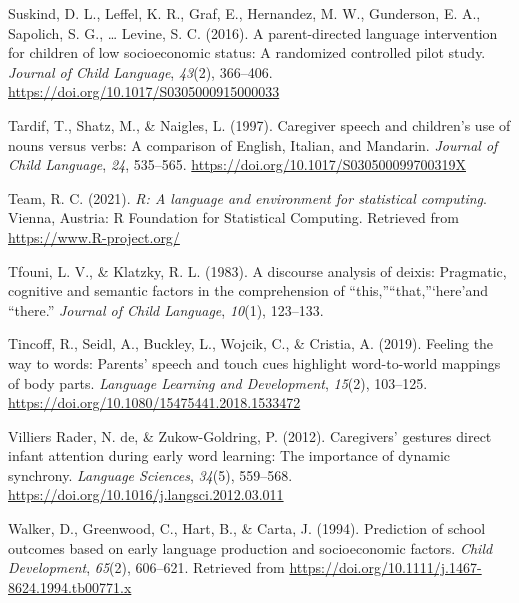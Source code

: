 \documentclass[
  man,mask,floatsintext]{apa6}
\newlength{\cslhangindent}
\newlength{\cslentryspacingunit} %
\newenvironment{CSLReferences}[2] %
 {%
  \setlength{\parindent}{0pt}
  \ifodd #1
  \let\oldpar\par
  \def\par{\hangindent=\cslhangindent\oldpar}
  \fi
  \setlength{\parskip}{#2\cslentryspacingunit}
 }%
 {}
\begin{document}
\begin{CSLReferences}{1}{0}
\leavevmode{}%
Suskind, D. L., Leffel, K. R., Graf, E., Hernandez, M. W., Gunderson, E. A., Sapolich, S. G., \ldots{} Levine, S. C. (2016). A parent-directed language intervention for children of low socioeconomic status: A randomized controlled pilot study. \emph{Journal of Child Language}, \emph{43}(2), 366--406. \url{https://doi.org/10.1017/S0305000915000033}

\leavevmode{}%
Tardif, T., Shatz, M., \& Naigles, L. (1997). Caregiver speech and children's use of nouns versus verbs: A comparison of {English}, {Italian}, and {Mandarin}. \emph{Journal of Child Language}, \emph{24}, 535--565. \url{https://doi.org/10.1017/S030500099700319X}

\leavevmode{}%
Team, R. C. (2021). \emph{R: {A} language and environment for statistical computing}. Vienna, Austria: R Foundation for Statistical Computing. Retrieved from \url{https://www.R-project.org/}

\leavevmode{}%
Tfouni, L. V., \& Klatzky, R. L. (1983). A discourse analysis of deixis: Pragmatic, cognitive and semantic factors in the comprehension of {``this,''}{``that,''}`here'and {``there.''} \emph{Journal of Child Language}, \emph{10}(1), 123--133.

\leavevmode{}%
Tincoff, R., Seidl, A., Buckley, L., Wojcik, C., \& Cristia, A. (2019). Feeling the way to words: {Parents}' speech and touch cues highlight word-to-world mappings of body parts. \emph{Language Learning and Development}, \emph{15}(2), 103--125. \url{https://doi.org/10.1080/15475441.2018.1533472}

\leavevmode{}%
Villiers Rader, N. de, \& Zukow-Goldring, P. (2012). Caregivers' gestures direct infant attention during early word learning: The importance of dynamic synchrony. \emph{Language Sciences}, \emph{34}(5), 559--568. \url{https://doi.org/10.1016/j.langsci.2012.03.011}

\leavevmode{}%
Walker, D., Greenwood, C., Hart, B., \& Carta, J. (1994). Prediction of school outcomes based on early language production and socioeconomic factors. \emph{Child Development}, \emph{65}(2), 606--621. Retrieved from \url{https://doi.org/10.1111/j.1467-8624.1994.tb00771.x}


\end{CSLReferences}
\end{document}
